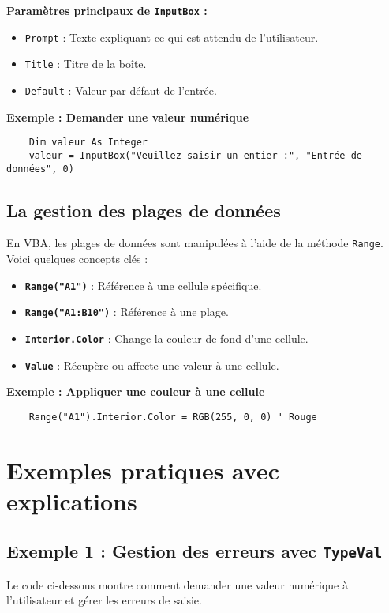 \documentclass[a4paper,12pt]{report}
\begin{document}
\textbf{Paramètres principaux de \texttt{InputBox} :}
\begin{itemize}
	\item \texttt{Prompt} : Texte expliquant ce qui est attendu de l'utilisateur.
	\item \texttt{Title} : Titre de la boîte.
	\item \texttt{Default} : Valeur par défaut de l'entrée.
\end{itemize}

\textbf{Exemple : Demander une valeur numérique}
\begin{lstlisting}
	Dim valeur As Integer
	valeur = InputBox("Veuillez saisir un entier :", "Entrée de données", 0)
\end{lstlisting}

\subsection{La gestion des plages de données}

En VBA, les plages de données sont manipulées à l'aide de la méthode \texttt{Range}. Voici quelques concepts clés :
\begin{itemize}
	\item \textbf{\texttt{Range("A1")}} : Référence à une cellule spécifique.
	\item \textbf{\texttt{Range("A1:B10")}} : Référence à une plage.
	\item \textbf{\texttt{Interior.Color}} : Change la couleur de fond d'une cellule.
	\item \textbf{\texttt{Value}} : Récupère ou affecte une valeur à une cellule.
\end{itemize}

\textbf{Exemple : Appliquer une couleur à une cellule}
\begin{lstlisting}
	Range("A1").Interior.Color = RGB(255, 0, 0) ' Rouge
\end{lstlisting}

\section{Exemples pratiques avec explications}

\subsection{Exemple 1 : Gestion des erreurs avec \texttt{TypeVal}}

Le code ci-dessous montre comment demander une valeur numérique à l'utilisateur et gérer les erreurs de saisie.
\end{document}
